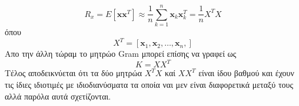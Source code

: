 \newline\hspace*{\fill}
\begin{equation}
        R_{x} = E[\mathbf{x}\mathbf{x}^{T}] \approx \dfrac{1}{n} \sum_{k=1}^{n} \mathbf{x}_{k}\mathbf{x}_{k}^{T} = \dfrac{1}{n} X^{T}X
\end{equation}
\hspace*{\fill}\newline
όπου 
\newline\hspace*{\fill}
\begin{equation}
        Χ^{Τ} = [\mathbf{x}_{1},\mathbf{x}_{2},\ldots,\mathbf{x}_{n},]
\end{equation}
\hspace*{\fill}\newline
Απο την άλλη τώραμ το μητρώο \textlatin{Gram} μπορεί επίσης να γραφεί ως 
\newline\hspace*{\fill}
\begin{equation}
        K = XX^{T}
\end{equation}
\hspace*{\fill}\newline
Τέλος αποδεικνύεται ότι τα δύο μητρώα $X^{T}X$ καί $XX^{T}$ είναι ίδου βαθμού και έχουν τις ίδιες ιδιοτιμές με ιδιοδιανύσματα τα οποία ναι μεν είναι διαφορετικά μεταξύ τους αλλά παρόλα αυτά σχετίζονται.

